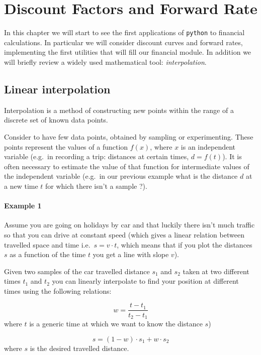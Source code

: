 \chapter{Discount Factors and Forward Rate}\label{interpolation---practical-lesson-3}

In this chapter we will start to see the first applications of \texttt{python} to financial calculations.
In particular we will consider discount curves and forward rates, implementing the first utilities that will fill our financial module.
In addition we will briefly review a widely used mathematical tool: \emph{interpolation}.

\section{Linear interpolation}\label{linear-interpolation}

Interpolation is a method of constructing new points within the range of a discrete set of known data points.

Consider to have few data points, obtained by sampling or experimenting. These points represent the values of a function \(f(x)\), where \(x\) is an independent variable (e.g.~in recording a trip: distances at certain times, \(d = f(t)\)). It is often necessary to estimate the value of that function for intermediate values of the independent variable (e.g.~in our previous example what is the distance \(d\) at a new time \(t\) for which there isn't a sample ?).

\subsubsection{Example 1}\label{example-1}

Assume you are going on holidays by car and that luckily there isn't much traffic so that you can drive at constant speed (which gives a linear relation between travelled space and time i.e.~\(s = v \cdot t\), which means that if you plot the distances \(s\) as a function of the time \(t\) you get a line with slope \(v\)).

Given two samples of the car travelled distance \(s_1\) and \(s_2\) taken at two different times \(t_1\) and \(t_2\) you can linearly interpolate to find your position at different times using the following relations:

\[w = \frac{t - t_1}{t_2 - t_1}\]
where $t$ is a generic time at which we want to know the distance $s$)

\[s = (1 - w)\cdot s_1 + w \cdot s_2\]
where $s$ is the desired travelled distance.

